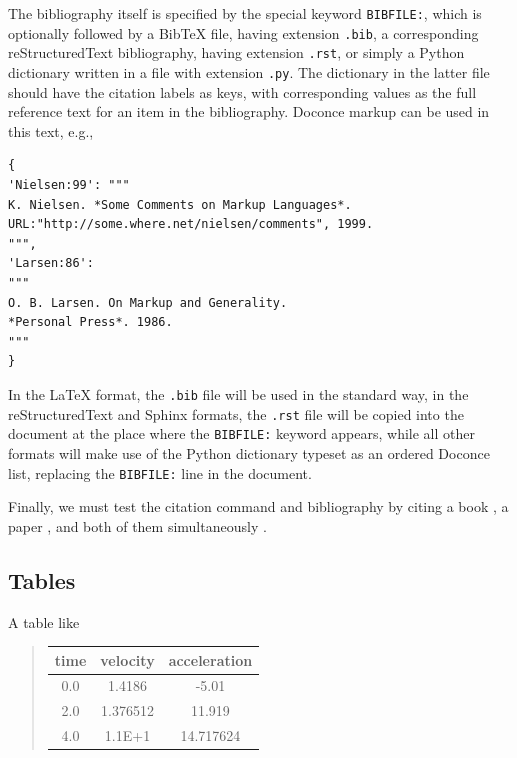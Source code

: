 \documentclass{article}
\begin{document}
The bibliography itself is specified by the special keyword {\fontsize{10pt}{10pt}\verb!BIBFILE:!},
which is optionally followed by a BibTeX file, having extension {\fontsize{10pt}{10pt}\verb!.bib!},
a corresponding reStructuredText bibliography, having extension {\fontsize{10pt}{10pt}\verb!.rst!},
or simply a Python dictionary written in a file with extension {\fontsize{10pt}{10pt}\verb!.py!}.
The dictionary in the latter file should have the citation labels as
keys, with corresponding values as the full reference text for an item
in the bibliography. Doconce markup can be used in this text, e.g.,
\begin{Verbatim}[fontsize=\fontsize{9pt}{9pt},tabsize=8,baselinestretch=0.85,
fontfamily=tt,xleftmargin=7mm]
{
'Nielsen:99': """
K. Nielsen. *Some Comments on Markup Languages*. 
URL:"http://some.where.net/nielsen/comments", 1999.
""",
'Larsen:86': 
"""
O. B. Larsen. On Markup and Generality.
*Personal Press*. 1986.
"""
}
\end{Verbatim}
\noindent
In the {\LaTeX} format, the {\fontsize{10pt}{10pt}\verb!.bib!} file will be used in the standard way,
in the reStructuredText and Sphinx formats, the {\fontsize{10pt}{10pt}\verb!.rst!} file will be
copied into the document at the place where the {\fontsize{10pt}{10pt}\verb!BIBFILE:!} keyword
appears, while all other formats will make use of the Python dictionary
typeset as an ordered Doconce list, replacing the {\fontsize{10pt}{10pt}\verb!BIBFILE:!} line
in the document.

Finally, we must test the citation command and bibliography by 
citing a book \cite{Python:Primer:09}, a paper \cite{Osnes:98},
and both of them simultaneously \cite{Python:Primer:09,Osnes:98}.

\subsection{Tables}

A table like


\begin{quote}\begin{tabular}{ccc}
\hline
\multicolumn{1}{c}{time} & \multicolumn{1}{c}{velocity} & \multicolumn{1}{c}{acceleration} \\
\hline
0.0          & 1.4186       & -5.01        \\
2.0          & 1.376512     & 11.919       \\
4.0          & 1.1E+1       & 14.717624    \\
\hline
\end{tabular}\end{quote}
\end{document}
